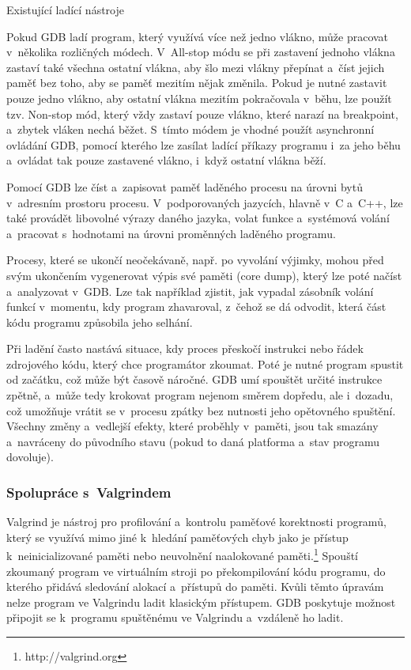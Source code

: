 \documentclass[czech,bachelor,male,python,dept460,hidelinks]{diploma}						%
\newcommand{\parspace}[1][]{
	\ifthenelse{\isempty{#1}}{\vspace{0mm}}{\vspace{#1}}
	\par
}
\begin{document}
\begin{section}{Existující ladící nástroje}
		\parspace Pokud GDB ladí program, který využívá více než jedno vlákno, může pracovat v~několika rozličných módech. \cite{gdb-multithreading}
		V~All-stop módu se při zastavení jednoho vlákna zastaví také všechna ostatní vlákna, aby šlo mezi vlákny přepínat a~číst jejich paměť bez toho,
		aby se paměť mezitím nějak změnila. Pokud je nutné zastavit pouze jedno vlákno, aby ostatní vlákna mezitím pokračovala v~běhu, lze použít tzv. Non-stop mód,
		který vždy zastaví pouze vlákno, které narazí na breakpoint, a~zbytek vláken nechá běžet. S~tímto módem je vhodné použít asynchronní ovládání GDB,
		pomocí kterého lze zasílat ladící příkazy programu i~za jeho běhu a~ovládat tak pouze zastavené vlákno, i~když ostatní vlákna běží.
		
		\parspace Pomocí GDB lze číst a~zapisovat paměť laděného procesu na úrovni bytů v~adresním prostoru procesu. V~podporovaných jazycích, hlavně
		v~C a~C++, lze také provádět libovolné výrazy daného jazyka, volat funkce a~systémová volání a~pracovat s~hodnotami na úrovni proměnných
		laděného programu.
		
		\parspace Procesy, které se ukončí neočekávaně, např. po vyvolání výjimky, mohou před svým ukončením vygenerovat výpis své paměti (core dump),
		který lze poté načíst a~analyzovat v~GDB. Lze tak například zjistit, jak vypadal zásobník volání funkcí v~momentu, kdy program zhavaroval,
		z~čehož se dá odvodit, která část kódu programu způsobila jeho selhání.
		
		\parspace Při ladění často nastává situace, kdy proces přeskočí instrukci nebo řádek zdrojového kódu, který chce programátor zkoumat. Poté je nutné
		program spustit od začátku, což může být časově náročné.
		GDB umí spouštět určité instrukce zpětně, a~může tedy krokovat program nejenom směrem dopředu, ale i~dozadu, což umožňuje vrátit se v~procesu zpátky bez
		nutnosti jeho opětovného spuštění.
		Všechny změny a~vedlejší efekty, které proběhly v~paměti, jsou tak smazány a~navráceny do původního stavu (pokud to daná platforma a~stav programu dovoluje).
			
		\subsubsection{Spolupráce s~Valgrindem}
			Valgrind je nástroj pro profilování a~kontrolu paměťové korektnosti programů, který se využívá mimo jiné k~hledání paměťových chyb jako je přístup
			k~neinicializované paměti nebo neuvolnění naalokované paměti.\footnote{http://valgrind.org}
			Spouští zkoumaný program ve virtuálním stroji po překompilování kódu programu, do kterého přidává sledování alokací a~přístupů do paměti.
			Kvůli těmto úpravám nelze program ve Valgrindu ladit klasickým přístupem. GDB poskytuje možnost připojit se k~programu spuštěnému ve
			Valgrindu a~vzdáleně ho ladit.

\end{section}
\end{document}
